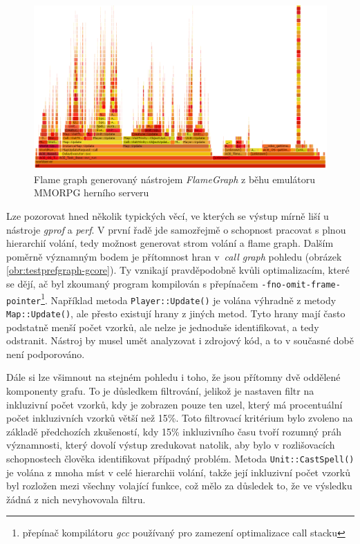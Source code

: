 \documentclass[czech,BP]{thesiskiv}
\begin{document}
\begin{figure}
    \centering
    \includegraphics[interpolate,width=1.0\textwidth]{img/test-gcore-brendan-flame.png}
    \caption{Flame graph generovaný nástrojem \emph{FlameGraph} z běhu emulátoru MMORPG herního serveru}
    \label{obr:testprefflamegregg-gcore}
\end{figure}

Lze pozorovat hned několik typických věcí, ve kterých se výstup mírně liší u nástroje \emph{gprof} a \emph{perf}. V první řadě jde samozřejmě o schopnost pracovat s plnou hierarchií volání, tedy možnost generovat strom volání a flame graph. Dalším poměrně významným bodem je přítomnost  hran v~\emph{call graph} pohledu (obrázek \ref{obr:testprefgraph-gcore}). Ty vznikají pravděpodobně kvůli optimalizacím, které se dějí, ač byl zkoumaný program kompilován s přepínačem \texttt{-fno-omit-frame-pointer}\footnote{přepínač kompilátoru \emph{gcc} používaný pro zamezení optimalizace call stacku}. Například metoda \texttt{Player::Update()} je volána výhradně z metody \texttt{Map::Update()}, ale přesto existují hrany z jiných metod. Tyto hrany mají často podstatně menší počet vzorků, ale nelze je jednoduše identifikovat, a tedy odstranit. Nástroj by musel umět analyzovat i zdrojový kód, a to v současné době není podporováno.

Dále si lze všimnout na stejném pohledu i toho, že jsou přítomny dvě oddělené komponenty grafu. To je důsledkem filtrování, jelikož je nastaven filtr na inkluzivní počet vzorků, kdy je zobrazen pouze ten uzel, který má procentuální počet inkluzivních vzorků větší než 15\%. Toto filtrovací kritérium bylo zvoleno na základě předchozích zkušeností, kdy 15\% inkluzivního času tvoří rozumný práh významnosti, který dovolí výstup zredukovat natolik, aby bylo v rozlišovacích schopnostech člověka identifikovat případný problém. Metoda \texttt{Unit::CastSpell()} je volána z mnoha míst v celé hierarchii volání, takže její inkluzivní počet vzorků byl rozložen mezi všechny volající funkce, což mělo za důsledek to, že ve výsledku žádná z nich nevyhovovala filtru.
\end{document}
